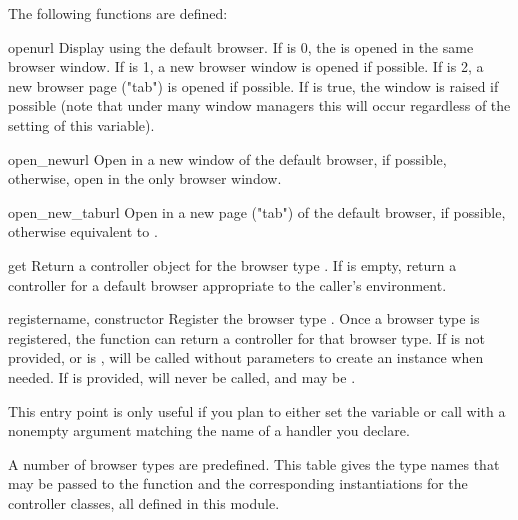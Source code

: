 The following functions are defined:

\begin{funcdesc}{open}{url}
  Display  using the default browser. If  is 0, the
   is opened in the same browser window.  If  is 1,
  a new browser window is opened if possible.  If  is 2,
  a new browser page ("tab") is opened if possible.  If  is
  true, the window is raised if possible (note that under many window
  managers this will occur regardless of the setting of this variable).

\end{funcdesc}

\begin{funcdesc}{open_new}{url}
  Open  in a new window of the default browser, if possible,
  otherwise, open  in the only browser window.
\end{funcdesc}

\begin{funcdesc}{open_new_tab}{url}
  Open  in a new page ("tab") of the default browser, if possible,
  otherwise equivalent to .
\end{funcdesc}

\begin{funcdesc}{get}{}
  Return a controller object for the browser type .  If
   is empty, return a controller for a default browser
  appropriate to the caller's environment.
\end{funcdesc}

\begin{funcdesc}{register}{name, constructor}
  Register the browser type .  Once a browser type is
  registered, the  function can return a controller
  for that browser type.  If  is not provided, or is
  ,  will be called without parameters to
  create an instance when needed.  If  is provided,
   will never be called, and may be .

  This entry point is only useful if you plan to either set the
   variable or call  with a nonempty
  argument matching the name of a handler you declare.
\end{funcdesc}

A number of browser types are predefined.  This table gives the type
names that may be passed to the  function and the
corresponding instantiations for the controller classes, all defined
in this module.

